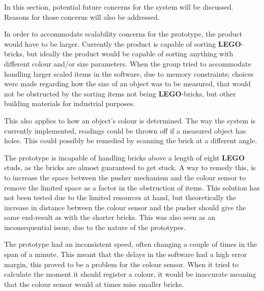 In this section, potential future concerns for the system will be discussed.
Reasons for those concerns will also be addressed.

In order to accommodate scalability concerns for the prototype, the product would have to be larger. 
Currently the product is capable of sorting \textbf{LEGO}-bricks, but ideally the product would be capable of sorting anything with different colour and/or size parameters.
When the group tried to accommodate handling larger scaled items in the software, due to memory constraints; choices were made regarding how the size of an object was to be measured, that would not be obstructed by the sorting items not being \textbf{LEGO}-bricks, but other building materials for industrial purposes.

This also applies to how an object's colour is determined.
The way the system is currently implemented, readings could be thrown off if a measured object has holes.
This could possibly be remedied by scanning the brick at a different angle. %

The prototype is incapable of handling bricks above a length of eight \textbf{LEGO} studs, as the bricks are almost guaranteed to get stuck.
A way to remedy this, is to increase the space between the pusher mechanism and the colour sensor to remove the limited space as a factor in the obstruction of items.
This solution has not been tested due to the limited resources at hand, but theoretically the increase in distance between the colour sensor and the pusher should give the same end-result as with the shorter bricks.
This was also seen as an inconsequential issue, due to the nature of the prototypes.

The prototype had an inconsistent speed, often changing a couple of times in the span of a minute.
This meant that the delays in the software had a high error margin, this proved to be a problem for the colour sensor.
When it tried to calculate the moment it should register a colour, it would be inaccurate meaning that the colour sensor would at times miss smaller bricks.

